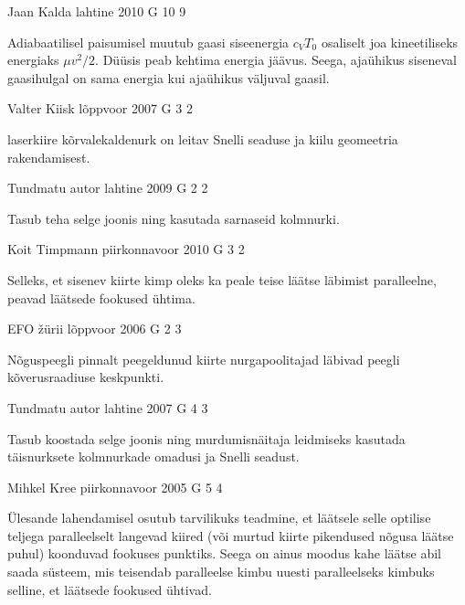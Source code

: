 \documentclass[11pt, twoside]{article}
\begin{document}
{%
{Jaan Kalda} %
{lahtine} %
{2010} %
{G 10} %
{9} %
{

\ifHint
Adiabaatilisel paisumisel muutub gaasi siseenergia $c_VT_0$ osaliselt joa kineetiliseks energiaks $\mu v^2/2$. Düüsis peab kehtima energia jäävus. Seega, ajaühikus siseneval gaasihulgal on sama energia kui ajaühikus väljuval gaasil.
\fi
}

{Valter Kiisk} %
{lõppvoor} %
{2007} %
{G 3} %
{2} %
{

\ifHint
laserkiire kõrvalekaldenurk on leitav Snelli seaduse ja kiilu geomeetria rakendamisest.
\fi
}

{Tundmatu autor} %
{lahtine} %
{2009} %
{G 2} %
{2} %
{

\ifHint
Tasub teha selge joonis ning kasutada sarnaseid kolmnurki.
\fi
}

{Koit Timpmann} %
{piirkonnavoor} %
{2010} %
{G 3} %
{2} %
{

\ifHint
Selleks, et sisenev kiirte kimp oleks ka peale teise läätse läbimist paralleelne, peavad läätsede fookused ühtima.
\fi
}

{EFO žürii} %
{lõppvoor} %
{2006} %
{G 2} %
{3} %
{

\ifHint
Nõguspeegli pinnalt peegeldunud kiirte nurgapoolitajad läbivad peegli kõverusraadiuse keskpunkti.
\fi
}

{Tundmatu autor} %
{lahtine} %
{2007} %
{G 4} %
{3} %
{

\ifHint
Tasub koostada selge joonis ning murdumisnäitaja leidmiseks kasutada täisnurksete kolmnurkade omadusi ja Snelli seadust.
\fi
}

{Mihkel Kree} %
{piirkonnavoor} %
{2005} %
{G 5} %
{4} %
{

\ifHint
Ülesande lahendamisel osutub tarvilikuks teadmine, et läätsele selle optilise teljega paralleelselt langevad kiired (või murtud kiirte pikendused nõgusa läätse puhul) koonduvad fookuses punktiks. Seega on ainus moodus kahe läätse abil saada süsteem, mis teisendab paralleelse kimbu uuesti paralleelseks kimbuks selline, et läätsede fookused ühtivad. 
\fi
}

}
\end{document}
